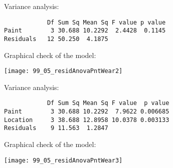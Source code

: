 \begin{frame}[fragile]
  \vspace{0.25cm}
  Variance analysis:
  \begin{verbatim}
            Df Sum Sq Mean Sq F value p value  
Paint        3 30.688 10.2292  2.4428  0.1145
Residuals   12 50.250  4.1875     
  \end{verbatim}
\end{frame}

\begin{frame}
   Graphical check of the model:\\
  \vspace{.1cm}
  \begin{center}
    \texttt{[image: 99\_05\_residAnovaPntWear2]}
    \end{center}
\end{frame}

\begin{frame}[fragile]
  \vspace{0.25cm}
  Variance analysis:
  \begin{verbatim}
            Df Sum Sq Mean Sq F value  p value   
Paint        3 30.688 10.2292  7.9622 0.006685
Location     3 38.688 12.8958 10.0378 0.003133
Residuals    9 11.563  1.2847    
  \end{verbatim}
\end{frame}

\begin{frame}
   Graphical check of the model:\\
  \vspace{.1cm}
  \begin{center}
    \texttt{[image: 99\_05\_residAnovaPntWear3]}
    \end{center}
\end{frame}




